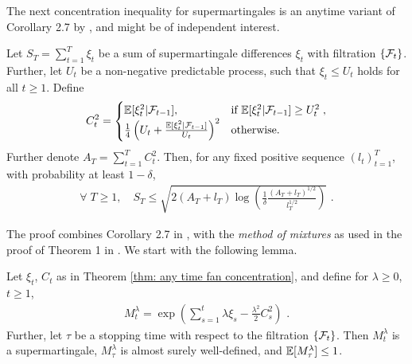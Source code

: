 The next concentration inequality for supermartingales is an anytime variant of Corollary 2.7 by \cite{FanExponentialinequalitiesmartingales2015}, and might be of independent interest.
\begin{theorem}\label{thm: any time fan concentration} Let $S_T = \sum_{t=1}^T \xi_t$ be a sum of supermartingale differences $\xi_t$ with filtration $\{\mathcal{F}_t\}$. Further, let $U_t$ be a non-negative predictable process, such that $\xi_t \leq U_t$ holds for all $t \geq 1$. Define
	\begin{align*}
	C_t^2 =	\begin{cases} \mathbb{E}[\xi_t^2|\mathcal{F}_{t-1}], & \text{if } \mathbb{E}[\xi_t^2|\mathcal{F}_{t-1}] \geq U_t^2\;,\\
	\frac{1}{4}\left(U_t + \frac{\mathbb{E}[\xi_t^2|\mathcal{F}_{t-1}]}{U_t}\right)^2 & \text{otherwise.}
	\end{cases}
	\end{align*}
	Further denote $A_T = \sum_{t=1}^T C_t^2$. Then, for any fixed positive sequence $(l_t)_{t=1}^T$, with probability at least $1-\delta$, 
	\begin{align*}
	\forall\; T \geq 1, \quad S_T \leq \sqrt{2(A_T + l_T) \log\left(\frac{1}{\delta}\frac{(A_T + l_T)^{1/2}}{l_T^{1/2}}\right)} \text { .}
	\end{align*}
\end{theorem}
\noindent
The proof combines Corollary 2.7 in \citep{FanExponentialinequalitiesmartingales2015}, with the \emph{method of mixtures} as used in the proof of Theorem 1 in \citep{Abbasi-YadkoriImprovedAlgorithmsLinear2011}. We start with the following lemma.
\begin{lemma}\label{lemma: supermartingale for fan concentration}
	Let $\xi_t$, $C_t$ as in Theorem \ref{thm: any time fan concentration}, and define for $\lambda \geq 0$, $t \geq 1$,
	\begin{align}
	M_t^\lambda = \exp\left(\sum_{s=1}^t \lambda \xi_s - \frac{\lambda^2}{2}C_s^2\right) \text{ .}
	\end{align}
	Further, let $\tau$ be a stopping time with respect to the filtration $\{\mathcal{F}_t\}$. Then $M_t^\lambda$ is a supermartingale, $M_\tau^\lambda$ is almost surely well-defined, and $\mathbb{E}[M_\tau^\lambda] \leq 1$.
\end{lemma}
